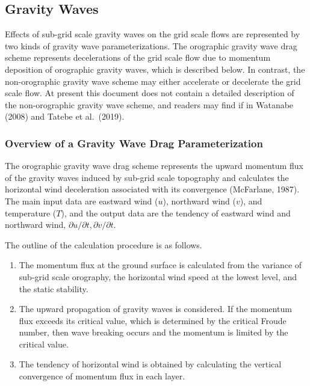 \hypertarget{gravity-waves}{%
\subsection{Gravity Waves}\label{gravity-waves}}

Effects of sub-grid scale gravity waves on the grid scale flows are represented by two kinds of gravity wave parameterizations. The orographic gravity wave drag scheme represents decelerations of the
grid scale flow due to momentum deposition of orographic gravity waves, which is described below. In contrast, the non-orographic gravity wave scheme may either accelerate or decelerate the grid scale
flow. At present this document does not contain a detailed description of the non-orographic gravity wave scheme, and readers may find if in Watanabe (2008) and Tatebe et al.~(2019).

\hypertarget{overview-of-a-gravity-wave-drag-parameterization}{%
\subsubsection{Overview of a Gravity Wave Drag Parameterization}\label{overview-of-a-gravity-wave-drag-parameterization}}

The orographic gravity wave drag scheme represents the upward momentum flux of the gravity waves induced by sub-grid scale topography and calculates the horizontal wind deceleration associated with
its convergence (McFarlane, 1987). The main input data are eastward wind (\(u\)), northward wind (\(v\)), and temperature (\(T\)), and the output data are the tendency of eastward wind and northward
wind, \(\partial u/\partial t, \partial v/\partial t\).

The outline of the calculation procedure is as follows.

\begin{enumerate}
\def\labelenumi{\arabic{enumi}.}
\item
  The momentum flux at the ground surface is calculated from the variance of sub-grid scale orography, the horizontal wind speed at the lowest level, and the static stability.
\item
  The upward propagation of gravity waves is considered. If the momentum flux exceeds its critical value, which is determined by the critical Froude number, then wave breaking occurs and the momentum
  is limited by the critical value.
\item
  The tendency of horizontal wind is obtained by calculating the vertical convergence of momentum flux in each layer.
\end{enumerate}

